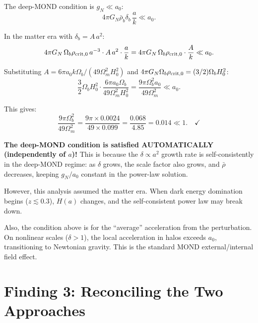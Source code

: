 \documentclass[11pt]{article}
\newcommand{\aM}{a_0}
\begin{document}
The deep-MOND condition is $g_N \ll \aM$:
\begin{equation}
4\pi G_N\bar\rho_b\delta_b\,\frac{a}{k} \ll \aM.
\end{equation}

In the matter era with $\delta_b = A\,a^2$:
\begin{equation}
4\pi G_N\,\Omega_b\rho_{\rm crit,0}\,a^{-3}\cdot A\,a^2\cdot\frac{a}{k}
= 4\pi G_N\,\Omega_b\rho_{\rm crit,0}\cdot\frac{A}{k} \ll \aM.
\end{equation}

Substituting $A = 6\pi\aM k\Omega_b/(49\Omega_m^2 H_0^2)$ and
$4\pi G_N\Omega_b\rho_{\rm crit,0} = (3/2)\Omega_b H_0^2$:
\begin{equation}
\frac{3}{2}\Omega_b H_0^2\cdot\frac{6\pi\aM\Omega_b}{49\Omega_m^2 H_0^2}
= \frac{9\pi\Omega_b^2\aM}{49\Omega_m^2} \ll \aM.
\end{equation}

This gives:
\begin{equation}
\frac{9\pi\Omega_b^2}{49\Omega_m^2}
= \frac{9\pi\times 0.0024}{49\times 0.099}
= \frac{0.068}{4.85} = 0.014 \ll 1. \quad\checkmark
\end{equation}

\textbf{The deep-MOND condition is satisfied AUTOMATICALLY
(independently of $a$)!} This is because the $\delta \propto a^2$
growth rate is self-consistently in the deep-MOND regime: as $\delta$
grows, the scale factor also grows, and $\bar\rho$ decreases, keeping
$g_N/\aM$ constant in the power-law solution.

However, this analysis assumed the matter era. When dark energy
domination begins ($z \lesssim 0.3$), $H(a)$ changes, and the
self-consistent power law may break down.

Also, the condition above is for the ``average'' acceleration
from the perturbation. On nonlinear scales ($\delta > 1$), the
local acceleration in halos exceeds $\aM$, transitioning to
Newtonian gravity. This is the standard MOND external/internal
field effect.


\part{Finding 3: Reconciling the Two Approaches}
\label{part:reconciliation}
\end{document}
